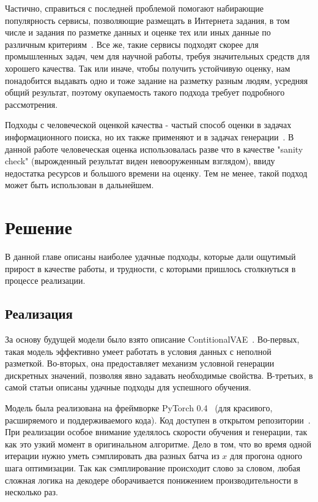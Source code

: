 \documentclass{spbau-diploma}
\begin{document}
Частично, справиться с последней проблемой помогают набирающие популярность 
сервисы, позволяющие размещать в Интернета задания, в том числе и задания по
разметке данных и оценке тех или иных данные по различным
критериям~\cite{yatoloka, mturk}. Все же, такие сервисы подходят скорее для 
промышленных задач, чем для научной работы, требуя значительных средств для 
хорошего качества. Так или иначе, чтобы получить устойчивую оценку, нам 
понадобится выдавать одно и тоже задание на разметку разным людям, усредняя
общий результат, поэтому окупаемость такого подхода требует подробного 
рассмотрения.

Подходы с человеческой оценкой качества - частый способ оценки в задачах 
информационного поиска, но их также применяют и в задачах 
генерации~\cite{1606.03498}. В данной работе человеческая оценка 
использовалась разве что в качестве "sanity check" (вырожденный результат 
виден невооруженным взглядом), ввиду недостатка ресурсов и большого времени на 
оценку. Тем не менее, такой подход может быть использован в дальнейшем.

\section{Решение}
В данной главе описаны наиболее удачные подходы, которые дали ощутимый прирост в 
качестве работы, и трудности, с которыми пришлось столкнуться в процессе 
реализации.

\subsection{Реализация}
За основу будущей модели было взято описание ContitionalVAE~\cite{text_cvae}. 
Во-первых, такая модель эффективно умеет работать в 
условия данных с неполной разметкой. Во-вторых, она предоставляет механизм
условной генерации дискретных значений, позволяя явно задавать необходимые 
свойства. В-третьих, в самой статьи описаны удачные подходы для успешного 
обучения.

Модель была реализована на фреймворке PyTorch 0.4~\cite{pytorch} (для 
красивого, расширяемого и поддерживаемого кода). Код доступен в открытом 
репозитории~\cite{github}. При реализации особое внимание уделялось скорости 
обучения и генерации, так как это узкий момент в оригинальном алгоритме. 
Дело в том, что во время одной итерации
нужно уметь сэмплировать два разных батча из $x$ для прогона одного шага 
оптимизации. Так как сэмплирование происходит слово за словом, любая сложная 
логика на декодере оборачивается понижением производительности в несколько 
раз.
\end{document}
